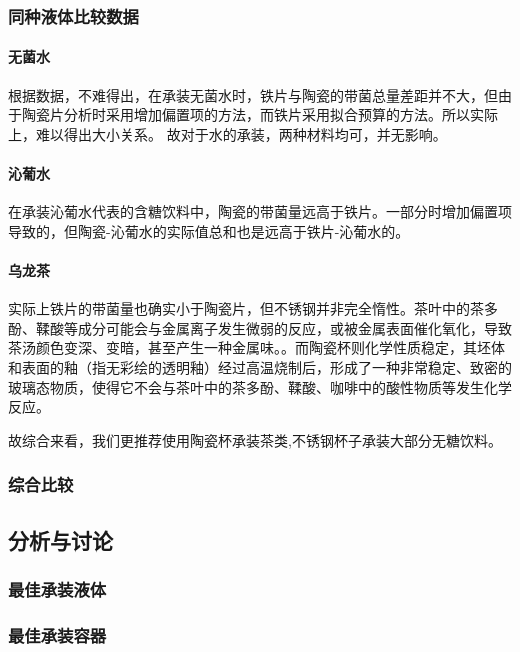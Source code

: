 \documentclass[12pt,a4paper]{ctexart}
\begin{document}
\subsubsection{同种液体比较数据}
\paragraph{无菌水}

根据数据，不难得出，在承装无菌水时，铁片与陶瓷的带菌总量差距并不大，但由于陶瓷片分析时采用增加偏置项的方法，而铁片采用拟合预算的方法。所以实际上，难以得出大小关系。
故对于水的承装，两种材料均可，并无影响。


\paragraph{沁葡水}
在承装沁葡水代表的含糖饮料中，陶瓷的带菌量远高于铁片。一部分时增加偏置项导致的，但陶瓷-沁葡水的实际值总和也是远高于铁片-沁葡水的。

\paragraph{乌龙茶}
实际上铁片的带菌量也确实小于陶瓷片，但不锈钢并非完全惰性。茶叶中的茶多酚、鞣酸等成分可能会与金属离子发生微弱的反应，或被金属表面催化氧化，导致茶汤颜色变深、变暗，甚至产生一种金属味。\cite{JSHJ201504002}。而陶瓷杯则化学性质稳定，其坯体和表面的釉（指无彩绘的透明釉）经过高温烧制后，形成了一种非常稳定、致密的玻璃态物质，使得它不会与茶叶中的茶多酚、鞣酸、咖啡中的酸性物质等发生化学反应。 

故综合来看，我们更推荐使用陶瓷杯承装茶类,不锈钢杯子承装大部分无糖饮料。



\subsubsection{综合比较}
\subsection{分析与讨论}
\subsubsection{最佳承装液体}
\subsubsection{最佳承装容器}
\end{document}
